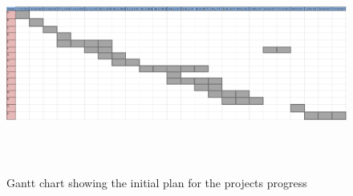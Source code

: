 \begin{landscape}


\begin{figure}[H]
\includegraphics[width =630px, height=270px]{../Graphics/TimePlanUpdated2.png} \par
\caption{Gantt chart showing the initial plan for the projects progress}
\end{figure}
\end{landscape}

